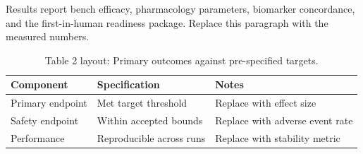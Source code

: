 
Results report bench efficacy, pharmacology parameters, biomarker concordance, and the first-in-human readiness package. Replace this paragraph with the measured numbers.

\begin{table}[H]
\caption{Table 2 layout: Primary outcomes against pre-specified targets.}
\label{tab:results_primary}
\centering
\begin{tabular}{>{\raggedright\arraybackslash}p{3.4cm} >{\raggedright\arraybackslash}p{4.6cm} >{\raggedright\arraybackslash}p{5.4cm}}
\toprule
\textbf{Component} & \textbf{Specification} & \textbf{Notes} \\
\midrule
  Primary endpoint & Met target threshold & Replace with effect size \\
  Safety endpoint & Within accepted bounds & Replace with adverse event rate \\
  Performance & Reproducible across runs & Replace with stability metric \\
\bottomrule
\end{tabular}
\end{table}
